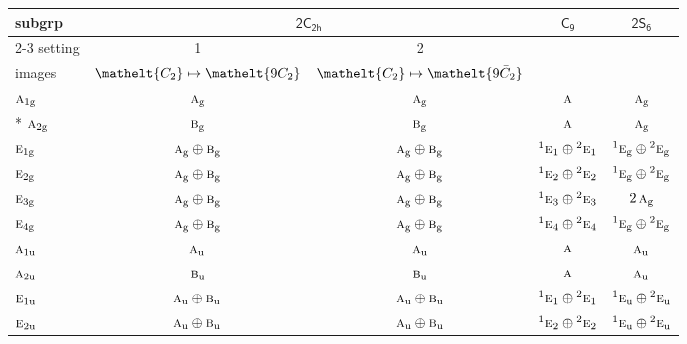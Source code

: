 \documentclass[10pt,a4paper]{article}
\numberwithin{equation}{section}
\newcommand{\eltfont}[1]{{\let\sigma\eltsigma\mathelt{#1}}}
\newcommand{\grp}[1]{\mathsf{#1}}
\newcommand{\irr}[1]{\text{\normalfont\scshape #1}}
\newcommand{\conjpair}[1]{{}^{#1}}
\newcommand{\cls}[1]{\eltfont{#1}}
\newcommand{\ptag}[1]{\mathrm{#1}}
\newcommand{\barred}[1]{\bar{#1}}
\begin{document}
{\small\begin{longtable}{@{}lcccc@{}}\toprule
subgrp & \multicolumn{2}{c}{\href{2C2h.pdf}{$\grp{2C_{2h}}$}} & \href{C9.pdf}{$\grp{C_{9}}$} & \href{2S6.pdf}{$\grp{2S_{6}}$}\\\cmidrule(lr){2-3}
setting & 1 & 2 &  & \\
images & {\scriptsize $\cls{C_{2}} \mapsto \cls{9C_{2}}$} & {\scriptsize $\cls{C_{2}} \mapsto \cls{9\barred{C}_{2}}$} &  & \\\midrule\endhead
\bottomrule\endfoot\endlastfoot
$\irr{a}_{1\ptag{g}}$ & $\irr{a}_{\ptag{g}}$ & $\irr{a}_{\ptag{g}}$ & $\irr{a}$ & $\irr{a}_{\ptag{g}}$\\*
$\irr{a}_{2\ptag{g}}$ & $\irr{b}_{\ptag{g}}$ & $\irr{b}_{\ptag{g}}$ & $\irr{a}$ & $\irr{a}_{\ptag{g}}$\\
$\irr{e}_{1\ptag{g}}$ & $\irr{a}_{\ptag{g}}\oplus \irr{b}_{\ptag{g}}$ & $\irr{a}_{\ptag{g}}\oplus \irr{b}_{\ptag{g}}$ & $\conjpair{1}\irr{e}_{1}\oplus \conjpair{2}\irr{e}_{1}$ & $\conjpair{1}\irr{e}_{\ptag{g}}\oplus \conjpair{2}\irr{e}_{\ptag{g}}$\\
$\irr{e}_{2\ptag{g}}$ & $\irr{a}_{\ptag{g}}\oplus \irr{b}_{\ptag{g}}$ & $\irr{a}_{\ptag{g}}\oplus \irr{b}_{\ptag{g}}$ & $\conjpair{1}\irr{e}_{2}\oplus \conjpair{2}\irr{e}_{2}$ & $\conjpair{1}\irr{e}_{\ptag{g}}\oplus \conjpair{2}\irr{e}_{\ptag{g}}$\\
$\irr{e}_{3\ptag{g}}$ & $\irr{a}_{\ptag{g}}\oplus \irr{b}_{\ptag{g}}$ & $\irr{a}_{\ptag{g}}\oplus \irr{b}_{\ptag{g}}$ & $\conjpair{1}\irr{e}_{3}\oplus \conjpair{2}\irr{e}_{3}$ & $2\,\irr{a}_{\ptag{g}}$\\
$\irr{e}_{4\ptag{g}}$ & $\irr{a}_{\ptag{g}}\oplus \irr{b}_{\ptag{g}}$ & $\irr{a}_{\ptag{g}}\oplus \irr{b}_{\ptag{g}}$ & $\conjpair{1}\irr{e}_{4}\oplus \conjpair{2}\irr{e}_{4}$ & $\conjpair{1}\irr{e}_{\ptag{g}}\oplus \conjpair{2}\irr{e}_{\ptag{g}}$\\
$\irr{a}_{1\ptag{u}}$ & $\irr{a}_{\ptag{u}}$ & $\irr{a}_{\ptag{u}}$ & $\irr{a}$ & $\irr{a}_{\ptag{u}}$\\
$\irr{a}_{2\ptag{u}}$ & $\irr{b}_{\ptag{u}}$ & $\irr{b}_{\ptag{u}}$ & $\irr{a}$ & $\irr{a}_{\ptag{u}}$\\
$\irr{e}_{1\ptag{u}}$ & $\irr{a}_{\ptag{u}}\oplus \irr{b}_{\ptag{u}}$ & $\irr{a}_{\ptag{u}}\oplus \irr{b}_{\ptag{u}}$ & $\conjpair{1}\irr{e}_{1}\oplus \conjpair{2}\irr{e}_{1}$ & $\conjpair{1}\irr{e}_{\ptag{u}}\oplus \conjpair{2}\irr{e}_{\ptag{u}}$\\
$\irr{e}_{2\ptag{u}}$ & $\irr{a}_{\ptag{u}}\oplus \irr{b}_{\ptag{u}}$ & $\irr{a}_{\ptag{u}}\oplus \irr{b}_{\ptag{u}}$ & $\conjpair{1}\irr{e}_{2}\oplus \conjpair{2}\irr{e}_{2}$ & $\conjpair{1}\irr{e}_{\ptag{u}}\oplus \conjpair{2}\irr{e}_{\ptag{u}}$\\

\end{longtable}}
\end{document}

